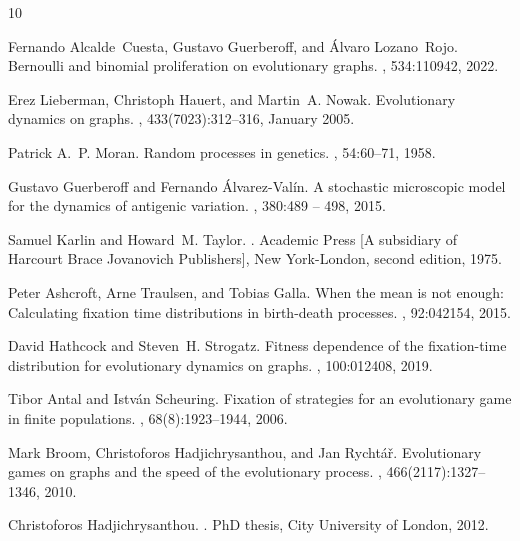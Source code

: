 \documentclass[a4paper,english,10pt]{amsart}
\theoremstyle{definition}
\numberwithin{equation}{section}
\begin{document}

\begin{thebibliography}{10}

Fernando Alcalde~Cuesta, Gustavo Guerberoff, and {\'A}lvaro Lozano~Rojo.
\newblock Bernoulli and binomial proliferation on evolutionary graphs.
, 534:110942, 2022.

Erez Lieberman, Christoph Hauert, and Martin~A. Nowak.
\newblock Evolutionary dynamics on graphs.
, 433(7023):312--316, January 2005.

Patrick A.~P. Moran.
\newblock Random processes in genetics.
, 54:60--71, 1958.

Gustavo Guerberoff and Fernando {\'A}lvarez-Val\'in.
\newblock A stochastic microscopic model for the dynamics of antigenic
  variation.
, 380:489 -- 498, 2015.

Samuel Karlin and Howard~M. Taylor.
.
\newblock Academic Press [A subsidiary of Harcourt Brace Jovanovich
  Publishers], New York-London, second edition, 1975.

Peter Ashcroft, Arne Traulsen, and Tobias Galla.
\newblock When the mean is not enough: Calculating fixation time distributions
  in birth-death processes.
, 92:042154, 2015.

David Hathcock and Steven~H. Strogatz.
\newblock Fitness dependence of the fixation-time distribution for evolutionary
  dynamics on graphs.
, 100:012408, 2019.

Tibor Antal and Istv{\'a}n Scheuring.
\newblock Fixation of strategies for an evolutionary game in finite
  populations.
, 68(8):1923--1944, 2006.

Mark Broom, Christoforos Hadjichrysanthou, and Jan Rycht{\'a}{\v r}.
\newblock Evolutionary games on graphs and the speed of the evolutionary
  process.
, 466(2117):1327--1346, 2010.

Christoforos Hadjichrysanthou.
.
\newblock PhD thesis, City University of London, 2012.


\end{thebibliography}
\end{document}

